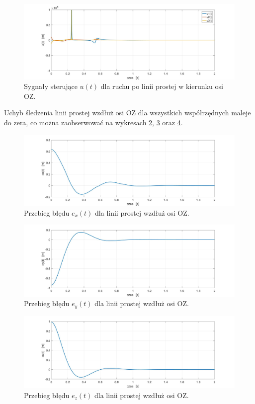\documentclass[eng,printmode]{mgr}
\begin{document}
\begin{figure}[!h]
\centering
\includegraphics[width=1\textwidth]{uodz.jpg}
\caption{\label{uodz}Sygnały sterujące $u(t)$ dla ruchu po linii prostej w kierunku osi OZ.}
\end{figure}
\newpage
Uchyb śledzenia linii prostej wzdłuż osi OZ dla wszystkich współrzędnych maleje do zera, co można zaobserwować na wykresach \ref{exodz}, \ref{eyodz} oraz \ref{ezodz}.

\begin{figure}[!h]
\centering
\includegraphics[width=1\textwidth]{exodz.jpg}
\caption{\label{exodz}Przebieg błędu $e_x(t)$ dla linii prostej wzdłuż osi OZ.}
\end{figure}
\begin{figure}[!h]
\centering
\includegraphics[width=1\textwidth]{eyodz.jpg}
\caption{\label{eyodz}Przebieg błędu $e_y(t)$ dla linii prostej wzdłuż osi OZ.}
\end{figure}
\begin{figure}[!h]
\centering
\includegraphics[width=1\textwidth]{ezodz.jpg}
\caption{\label{ezodz}Przebieg błędu $e_z(t)$ dla linii prostej wzdłuż osi OZ.}
\end{figure}
\newpage
\end{document}
